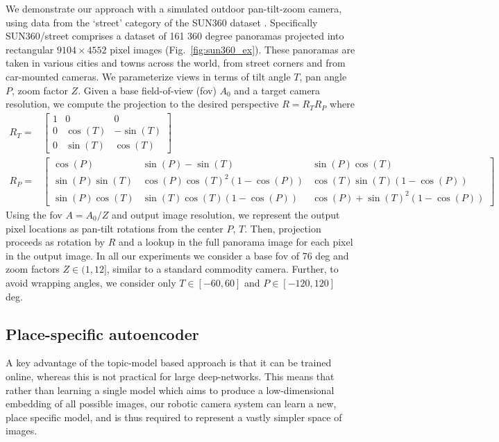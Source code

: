 We demonstrate our approach with a simulated outdoor pan-tilt-zoom camera, using data from the `street' category of the SUN360 dataset \citep{SUN360}. Specifically SUN360/street comprises a dataset of 161 360 degree panoramas projected into rectangular $9104 \times 4552$ pixel images (Fig.~\ref{fig:sun360_ex}). These panoramas are taken in various cities and towns across the world, from street corners and from car-mounted cameras. We parameterize views in terms of tilt angle $T$, pan angle $P$, zoom factor $Z$. Given a base field-of-view (fov) $A_0$ and a target camera resolution, we compute the projection to the desired perspective $R = R_TR_P$ where
\begin{equation}
\begin{split}
R_T =& 
\begin{bmatrix}
1 & 0 & 0\\
0 & \cos(T) & -\sin(T)\\
0 & \sin(T) & \cos(T)
\end{bmatrix}\\
R_P =&  
\begin{bmatrix}
\cos(P)        & \sin(P) - \sin(T)            & \sin(P)\cos(T)\\
\sin(P)\sin(T) & \cos(P)\cos(T)^2(1 -\cos(P)) & \cos(T)\sin(T)(1-\cos(P))\\
\sin(P)\cos(T) & \sin(T)\cos(T)(1-\cos(P))    & \cos(P)+\sin(T)^2(1-\cos(P))
\end{bmatrix}
\end{split}
\end{equation}
Using the fov $A = A_0/Z$ and output image resolution, we represent the output pixel locations as pan-tilt rotations from the center $P$, $T$. Then, projection proceeds as rotation by $R$ and a lookup in the full panorama image for each pixel in the output image. In all our experiments we consider a base fov of 76 deg and zoom factors $Z \in (1, 12]$, similar to a standard commodity camera. Further, to avoid wrapping angles, we consider only $T \in [-60, 60]$ and $P \in [-120, 120]$ deg.

\subsection{Place-specific autoencoder}

A key advantage of the topic-model based approach is that it can be trained online, whereas this is not practical for large deep-networks. This means that rather than learning a single model which aims to produce a low-dimensional embedding of all possible images, our robotic camera system can learn a new, place specific model, and is thus required to represent a vastly simpler space of images.

